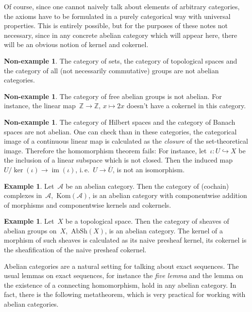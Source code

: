 \documentclass{amsart}
\makeatletter
\theoremstyle{definition}
\newtheorem{ex}[defn]{Example}
\newtheorem{non-ex}[defn]{Non-example}
\theoremstyle{plain}
\theoremstyle{remark}
\newcommand{\ZZ}{\mathbb{Z}}
\newcommand{\A}{\mathcal{A}}
\newcommand{\Kom}{\mathrm{Kom}}
\newcommand{\AbSh}{\mathrm{AbSh}}
\DeclareMathOperator{\Image}{im}
\DeclareMathOperator{\Kernel}{ker}
\newcommand{\?}{\,{:}\,}
\renewcommand{\_}{\mathpunct{.}\,}
\newcommand{\ie}{i.\,e.\@\xspace}
\makeatother
\begin{document}
Of course, since one cannot naively talk about elements of arbitrary
categories, the axioms have to be formulated in a purely categorical way with
universal properties. This is entirely possible, but for the purposes of these
notes not necessary, since in any concrete abelian category which will appear here,
there will be an obvious notion of kernel and cokernel.

\begin{non-ex}The category of sets, the category of topological spaces and the
category of all (not necessarily commutative) groups are not abelian
categories.\end{non-ex}

\begin{non-ex}The category of free abelian groups is not abelian. For instance,
the linear map~$\ZZ \to \ZZ,\,x \mapsto 2x$ doesn't have a cokernel in this
category.\end{non-ex}

\begin{non-ex}The category of Hilbert spaces and the category of Banach spaces
are not abelian. One can check than in these categories, the categorical image
of a continuous linear map is calculated as the \emph{closure} of the
set-theoretical image. Therefore the homomorphism theorem fails: For instance,
let~$\iota : U \hookrightarrow X$ be the inclusion of a linear subspace which is
not closed. Then the induced map~$U/\Kernel(\iota) \to \Image(\iota)$, \ie~$U
\to \overline{U}$, is not an isomorphism.
\end{non-ex}

\begin{ex}Let~$\A$ be an abelian category. Then the category of (cochain)
complexes in~$\A$,~$\Kom(\A)$, is an abelian category with componentwise
addition of morphisms and componentwise kernels and cokernels.\end{ex}

\begin{ex}Let~$X$ be a topological space. Then the category of sheaves of
abelian groups on~$X$,~$\AbSh(X)$, is an abelian category. The kernel of a
morphism of such sheaves is calculated as its naive presheaf kernel, its
cokernel is the sheafification of the naive presheaf cokernel.\end{ex}

Abelian categories are a natural setting for talking about exact sequences. The
usual lemmas on exact sequences, for instance the \emph{five lemma} and the
lemma on the existence of a connecting homomorphism, hold in any abelian
category. In fact, there is the following metatheorem, which is very practical
for working with abelian categories.
\end{document}
